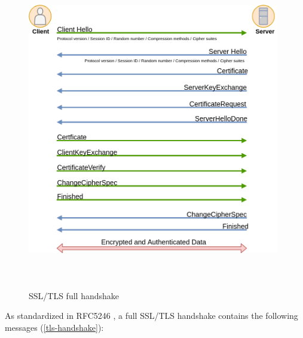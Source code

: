 \begin{figure}[!htbp]
\centering
\includegraphics[width=11cm,height=14cm]{figures/dtls/tls-handshake.png}
\caption{SSL/TLS full handshake}\label{tls-handshake}
\end{figure}


As standardized in RFC5246 \cite{rfc5246}, a full SSL/\ac{TLS} handshake contains the following messages (\autoref{tls-handshake}):

